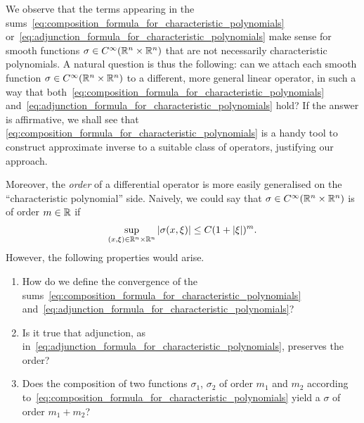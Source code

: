 We observe that
the terms appearing in the sums~\eqref{eq:composition_formula_for_characteristic_polynomials} or~\eqref{eq:adjunction_formula_for_characteristic_polynomials} make sense for smooth functions $\sigma \in {C^\infty(\mathbb{R}^n \times \mathbb{R}^n)}$ that are not necessarily characteristic polynomials.
A natural question is thus the following:
can we attach each smooth function $\sigma \in {C^\infty(\mathbb{R}^n \times \mathbb{R}^n)}$ to a different, more general linear operator,
in such a way that both~\eqref{eq:composition_formula_for_characteristic_polynomials} and~\eqref{eq:adjunction_formula_for_characteristic_polynomials} hold?
If the answer is affirmative,
we shall see that
\eqref{eq:composition_formula_for_characteristic_polynomials} is a handy tool to construct approximate inverse to a suitable class of operators,
justifying our approach.

Moreover,
the \emph{order} of a differential operator is more easily generalised on the ``characteristic polynomial'' side.
Naively, we could say that $\sigma \in {C^\infty(\mathbb{R}^n \times \mathbb{R}^n)}$ is of order $m \in \mathbb{R}$ if
\begin{align*}
    \sup_{(x, \xi) \in \mathbb{R}^n \times \mathbb{R}^n} \left|{\sigma(x, \xi)}\right| \leq C (1 + \left|{\xi}\right|)^m.
\end{align*}
However,
the following properties would arise.
\begin{enumerate}
    \item How do we define the convergence of the sums~\eqref{eq:composition_formula_for_characteristic_polynomials} and~\eqref{eq:adjunction_formula_for_characteristic_polynomials}?
    \item Is it true that adjunction, as in~\eqref{eq:adjunction_formula_for_characteristic_polynomials}, preserves the order?
    \item Does the composition of two functions $\sigma_1$, $\sigma_2$ of order $m_1$ and $m_2$ according to~\eqref{eq:composition_formula_for_characteristic_polynomials} yield a $\sigma$ of order $m_1 + m_2$?
\end{enumerate}

